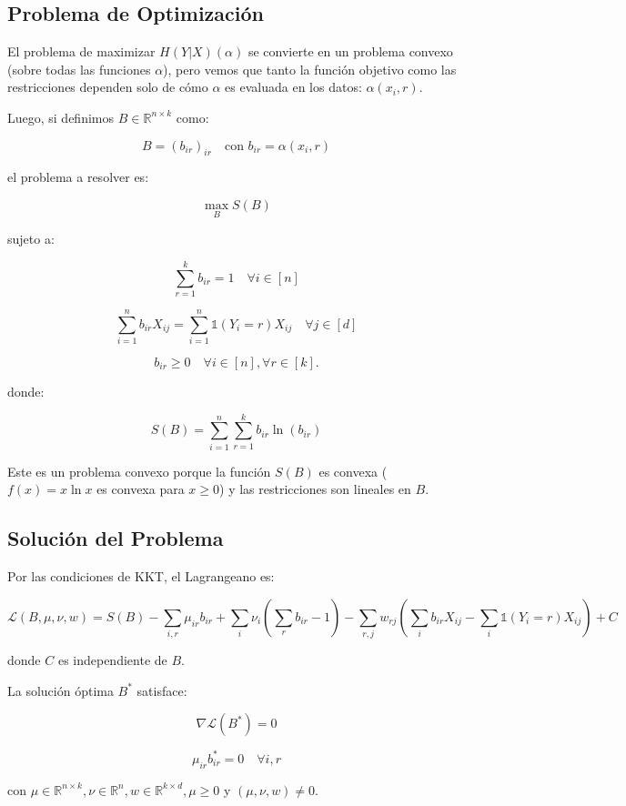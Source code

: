 \subsection{Problema de Optimización}

El problema de maximizar \( H(Y|X)(\alpha) \) se convierte en un problema convexo (sobre todas las funciones \( \alpha \)), pero vemos que tanto la función objetivo como las restricciones dependen solo de cómo \( \alpha \) es evaluada en los datos: \( \alpha(x_i,r) \).

Luego, si definimos \( B \in \mathbb{R}^{n \times k} \) como:

\[ B = (b_{ir})_{ir} \quad \text{con } b_{ir} = \alpha(x_i,r) \]

el problema a resolver es:

\[ \max_B S(B) \]

sujeto a:

\[ \sum_{r=1}^{k} b_{ir} = 1 \quad \forall i \in [n] \]

\[ \sum_{i=1}^{n} b_{ir} X_{ij} = \sum_{i=1}^{n} \mathbb{1}(Y_i = r) X_{ij} \quad \forall j \in [d] \]

\[ b_{ir} \geq 0 \quad \forall i \in [n], \forall r \in [k]. \]

donde:

\[ S(B) = \sum_{i=1}^{n} \sum_{r=1}^{k} b_{ir} \ln(b_{ir}) \]

Este es un problema convexo porque la función \( S(B) \) es convexa (\( f(x) = x \ln x \) es convexa para \( x \geq 0 \)) y las restricciones son lineales en \( B \).

\subsection{Solución del Problema}

Por las condiciones de KKT, el Lagrangeano es:

\[ \mathcal{L}(B, \mu, \nu, w) = S(B) - \sum_{i,r} \mu_{ir} b_{ir} + \sum_{i} \nu_i \left( \sum_{r} b_{ir} - 1 \right) - \sum_{r,j} w_{rj} \left( \sum_{i} b_{ir} X_{ij} - \sum_{i} \mathbb{1}(Y_i = r) X_{ij} \right) + C \]

donde \( C \) es independiente de \( B \).

La solución óptima \( B^* \) satisface:

\[ \nabla \mathcal{L}(B^*) = 0 \]

\[ \mu_{ir} b_{ir}^* = 0 \quad \forall i,r \]

con \( \mu \in \mathbb{R}^{n \times k}, \nu \in \mathbb{R}^n, w \in \mathbb{R}^{k \times d}, \mu \geq 0 \) y \( (\mu, \nu, w) \neq 0 \).

